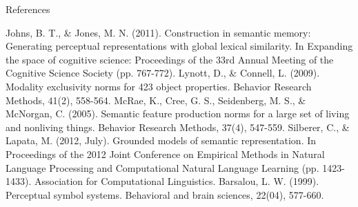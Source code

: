\documentclass[12pt,a4paper]{beamer}
\begin{document}
\begin{frame}{References}
\begin{thebibliography}{-}
 Johns, B. T., \& Jones, M. N. (2011). Construction in semantic memory: Generating perceptual representations with global lexical similarity. In Expanding the space of cognitive science: Proceedings of the 33rd Annual Meeting of the Cognitive Science Society (pp. 767-772).
 Lynott, D., \& Connell, L. (2009). Modality exclusivity norms for 423 object properties. Behavior Research Methods, 41(2), 558-564.
 McRae, K., Cree, G. S., Seidenberg, M. S., \& McNorgan, C. (2005). Semantic feature production norms for a large set of living and nonliving things. Behavior Research Methods, 37(4), 547-559.
 Silberer, C., \& Lapata, M. (2012, July). Grounded models of semantic representation. In Proceedings of the 2012 Joint Conference on Empirical Methods in Natural Language Processing and Computational Natural Language Learning (pp. 1423-1433). Association for Computational Linguistics.
 Barsalou, L. W. (1999). Perceptual symbol systems. Behavioral and brain sciences, 22(04), 577-660.
\end{thebibliography}
\end{frame}
\end{document}
